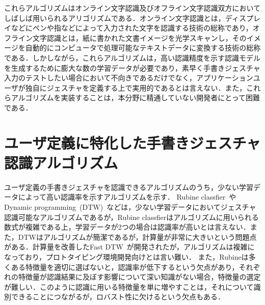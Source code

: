 これらアルゴリズムはオンライン文字認識及びオフライン文字認識双方においてしばしば用いられるアリゴリズムである．オンライン文字認識とは，ディスプレイなどにペンや指などによって入力された文字を認識する技術の総称であり，オフライン文字認識とは，紙に書かれた文書イメージを光学スキャンし，そのイメージを自動的にコンピュータで処理可能なテキストデータに変換する技術の総称である．しかしながら，これらアルゴリズムは，高い認識精度を示す認識モデルを生成するために膨大な数の学習データが必要であり，素早く手書きジェスチャ入力のテストしたい場合において不向きであるだけでなく，アプリケーションユーザが独自にジェスチャを定義する上で実用的であるとは言えない．また，これらアルゴリズムを実装することは，本分野に精通していない開発者にとって困難である．

\section{ユーザ定義に特化した手書きジェスチャ認識アルゴリズム}
ユーザ定義の手書きジェスチャを認識できるアルゴリズムのうち，少ない学習データによって高い認識率を示すアルゴリズムを示す．
Rubine classfier~\cite{Rubine:1991:SGE:122718.122753}やDynamic programming~(DTW)~\cite{Tappert:1982:CSR:1664966.1664979}などは，少ない学習データにおいてジェスチャ認識可能なアルゴリズムであるが，Rubine classfierはアルゴリズムに用いられる数式が複雑である上，学習データが2つの場合は認識率が高いとは言えない．また，DTWはアルゴリズムが簡潔であるが，計算量が非常に大きいという問題点がある．計算量を改善したFast DTW~\cite{Salvador:2007:TAD:1367985.1367993}が開発されたが，アルゴリズムは複雑になっており，プロトタイピング環境開発向けとは言い難い．
また，Rubineは多くある特徴量を適切に選ばないと，認識率が低下するという欠点があり，それぞれの特徴量が認識結果に及ぼす影響について深い知識がない場合，特徴量の選定が難しい．このように認識に用いる特徴量を単に増やすことは，それについて識別できることにつながるが，ロバスト性に欠けるという欠点もある．


